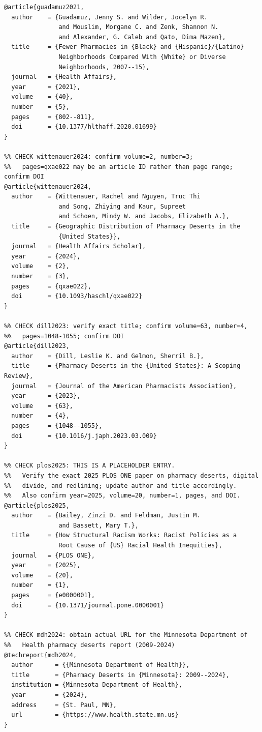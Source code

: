 \documentclass[12pt]{article}
\begin{document}
\begin{Verbatim}[fontsize=\small, xleftmargin=0.2in, breaklines=true, breakanywhere=true]
@article{guadamuz2021,
  author    = {Guadamuz, Jenny S. and Wilder, Jocelyn R.
               and Mouslim, Morgane C. and Zenk, Shannon N.
               and Alexander, G. Caleb and Qato, Dima Mazen},
  title     = {Fewer Pharmacies in {Black} and {Hispanic}/{Latino}
               Neighborhoods Compared With {White} or Diverse
               Neighborhoods, 2007--15},
  journal   = {Health Affairs},
  year      = {2021},
  volume    = {40},
  number    = {5},
  pages     = {802--811},
  doi       = {10.1377/hlthaff.2020.01699}
}

%% CHECK wittenauer2024: confirm volume=2, number=3;
%%   pages=qxae022 may be an article ID rather than page range; confirm DOI
@article{wittenauer2024,
  author    = {Wittenauer, Rachel and Nguyen, Truc Thi
               and Song, Zhiying and Kaur, Supreet
               and Schoen, Mindy W. and Jacobs, Elizabeth A.},
  title     = {Geographic Distribution of Pharmacy Deserts in the
               {United States}},
  journal   = {Health Affairs Scholar},
  year      = {2024},
  volume    = {2},
  number    = {3},
  pages     = {qxae022},
  doi       = {10.1093/haschl/qxae022}
}

%% CHECK dill2023: verify exact title; confirm volume=63, number=4,
%%   pages=1048-1055; confirm DOI
@article{dill2023,
  author    = {Dill, Leslie K. and Gelmon, Sherril B.},
  title     = {Pharmacy Deserts in the {United States}: A Scoping Review},
  journal   = {Journal of the American Pharmacists Association},
  year      = {2023},
  volume    = {63},
  number    = {4},
  pages     = {1048--1055},
  doi       = {10.1016/j.japh.2023.03.009}
}

%% CHECK plos2025: THIS IS A PLACEHOLDER ENTRY.
%%   Verify the exact 2025 PLOS ONE paper on pharmacy deserts, digital
%%   divide, and redlining; update author and title accordingly.
%%   Also confirm year=2025, volume=20, number=1, pages, and DOI.
@article{plos2025,
  author    = {Bailey, Zinzi D. and Feldman, Justin M.
               and Bassett, Mary T.},
  title     = {How Structural Racism Works: Racist Policies as a
               Root Cause of {US} Racial Health Inequities},
  journal   = {PLOS ONE},
  year      = {2025},
  volume    = {20},
  number    = {1},
  pages     = {e0000001},
  doi       = {10.1371/journal.pone.0000001}
}

%% CHECK mdh2024: obtain actual URL for the Minnesota Department of
%%   Health pharmacy deserts report (2009-2024)
@techreport{mdh2024,
  author      = {{Minnesota Department of Health}},
  title       = {Pharmacy Deserts in {Minnesota}: 2009--2024},
  institution = {Minnesota Department of Health},
  year        = {2024},
  address     = {St. Paul, MN},
  url         = {https://www.health.state.mn.us}
}



\end{Verbatim}
\end{document}
